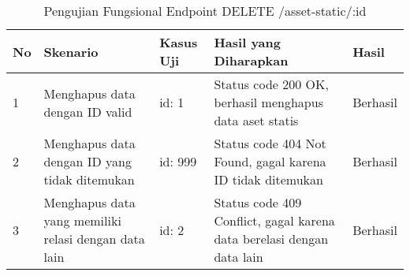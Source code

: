 \begin{table}[H]
    \centering
    \begin{tabular}{|p{0.5cm}|p{3cm}|p{5cm}|p{5cm}|p{1.5cm}|}
        \hline
        \rowcolor[HTML]{DAE8FC} 
        \textbf{No} & \textbf{Skenario} & \textbf{Kasus Uji} & \textbf{Hasil yang Diharapkan} & \textbf{Hasil} \\ \hline
        1 & Menghapus data dengan ID valid & 
        id: 1 & 
        Status code 200 OK, berhasil menghapus data aset statis & 
        Berhasil \\ \hline
        2 & Menghapus data dengan ID yang tidak ditemukan & 
        id: 999 & 
        Status code 404 Not Found, gagal karena ID tidak ditemukan & 
        Berhasil \\ \hline
        3 & Menghapus data yang memiliki relasi dengan data lain & 
        id: 2 & 
        Status code 409 Conflict, gagal karena data berelasi dengan data lain & 
        Berhasil \\ \hline
    \end{tabular}
    \caption{Pengujian Fungsional Endpoint DELETE /asset-static/:id}
    \label{tab:asset_static_delete_testing}
\end{table}
